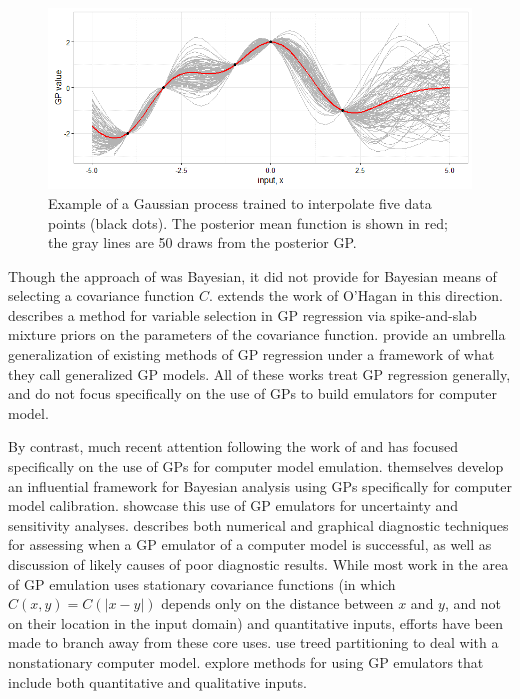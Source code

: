 \documentclass{article}
\begin{document}
\begin{figure}[h]
\centering
\includegraphics[width=.75\linewidth]{gp_example}
\caption{Example of a Gaussian process trained to interpolate five data points (black dots). The posterior mean function is shown in red; the gray lines are 50 draws from the posterior GP.}
\label{fig:gp_example}
\end{figure}

Though the approach of \cite{OHagan1978} was Bayesian, it did not provide for Bayesian means of selecting a covariance function $C$. \cite{Neal} extends the work of O'Hagan in this direction. \cite{Savitsky2011} describes a method for variable selection in GP regression via spike-and-slab mixture priors on the parameters of the covariance function. \cite{Shang2013} provide an umbrella generalization of existing methods of GP regression under a framework of what they call generalized GP models. All of these works treat GP regression generally, and do not focus specifically on the use of GPs to build emulators for computer model.

By contrast, much recent attention following the work of \cite{Santner2003a} and \cite{Sacks1989} has focused specifically on the use of GPs for computer model emulation. 
\cite{Kennedy2001} themselves develop an influential framework for Bayesian analysis using GPs specifically for computer model calibration. \cite{Kennedy2006} showcase this use of GP emulators for uncertainty and sensitivity analyses. \cite{Bastos2009} describes both numerical and graphical diagnostic techniques for assessing when a GP emulator of a computer model is successful, as well as discussion of likely causes of poor diagnostic results. While most work in the area of GP emulation uses stationary covariance functions (in which $C(x,y)=C(|x-y|)$ depends only on the distance between $x$ and $y$, and not on their location in the input domain) and quantitative inputs, efforts have been made to branch away from these core uses. \cite{Gramacy2008} use treed partitioning to deal with a nonstationary computer model. \cite{Qian2008} explore methods for using GP emulators that include both quantitative and qualitative inputs.
\end{document}
